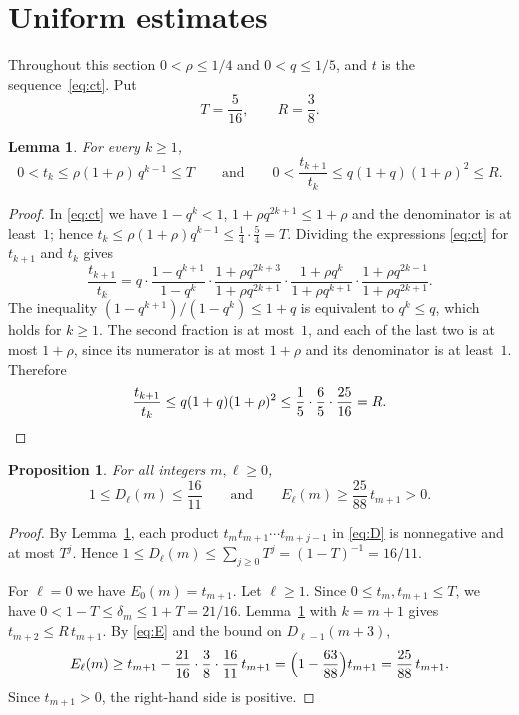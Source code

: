 \documentclass[11pt]{amsart}
\newtheorem{proposition}[theorem]{Proposition}
\newtheorem{lemma}[theorem]{Lemma}
\theoremstyle{definition}
\theoremstyle{remark}
\numberwithin{equation}{section}
\begin{document}
\section{Uniform estimates}\label{sec:estimates}

Throughout this section $0<\rho\le1/4$ and $0<q\le1/5$, and $t$ is the sequence~\eqref{eq:ct}. Put
\[
T=\frac{5}{16},\qquad R=\frac38.
\]

\begin{lemma}\label{lem:estimates}
For every $k\ge1$,
\[
0<t_k\le\rho(1+\rho)\,q^{k-1}\le T
\qquad\text{and}\qquad
0<\frac{t_{k+1}}{t_k}\le q(1+q)(1+\rho)^2\le R .
\]
\end{lemma}

\begin{proof}
In \eqref{eq:ct} we have $1-q^k<1$, $1+\rho q^{2k+1}\le1+\rho$ and the denominator is at least~$1$; hence $t_k\le\rho(1+\rho)q^{k-1}\le\frac14\cdot\frac54=T$. Dividing the expressions \eqref{eq:ct} for $t_{k+1}$ and $t_k$ gives
\[
\frac{t_{k+1}}{t_k}
=q\cdot\frac{1-q^{k+1}}{1-q^k}\cdot\frac{1+\rho q^{2k+3}}{1+\rho q^{2k+1}}\cdot\frac{1+\rho q^{k}}{1+\rho q^{k+1}}\cdot\frac{1+\rho q^{2k-1}}{1+\rho q^{2k+1}}.
\]
The inequality $(1-q^{k+1})/(1-q^k)\le1+q$ is equivalent to $q^k\le q$, which holds for $k\ge1$. The second fraction is at most~$1$, and each of the last two is at most $1+\rho$, since its numerator is at most $1+\rho$ and its denominator is at least~$1$. Therefore
\[
\frac{t_{k+1}}{t_k}\le q(1+q)(1+\rho)^2\le\frac15\cdot\frac65\cdot\frac{25}{16}=R.\qedhere
\]
\end{proof}

\begin{proposition}\label{prop:main-bound}
For all integers $m,\ell\ge0$,
\[
1\le D_\ell(m)\le\frac{16}{11}
\qquad\text{and}\qquad
E_\ell(m)\ge\frac{25}{88}\,t_{m+1}>0.
\]
\end{proposition}

\begin{proof}
By Lemma~\ref{lem:estimates}, each product $t_mt_{m+1}\cdots t_{m+j-1}$ in \eqref{eq:D} is nonnegative and at most $T^j$. Hence $1\le D_\ell(m)\le\sum_{j\ge0}T^j=(1-T)^{-1}=16/11$.

For $\ell=0$ we have $E_0(m)=t_{m+1}$. Let $\ell\ge1$. Since $0\le t_m,t_{m+1}\le T$, we have $0<1-T\le\delta_m\le1+T=21/16$. Lemma~\ref{lem:estimates} with $k=m+1$ gives $t_{m+2}\le R\,t_{m+1}$. By \eqref{eq:E} and the bound on $D_{\ell-1}(m+3)$,
\[
E_\ell(m)\ge t_{m+1}-\frac{21}{16}\cdot\frac38\cdot\frac{16}{11}\,t_{m+1}=\Bigl(1-\frac{63}{88}\Bigr)t_{m+1}=\frac{25}{88}\,t_{m+1}.
\]
Since $t_{m+1}>0$, the right-hand side is positive.
\end{proof}
\end{document}
